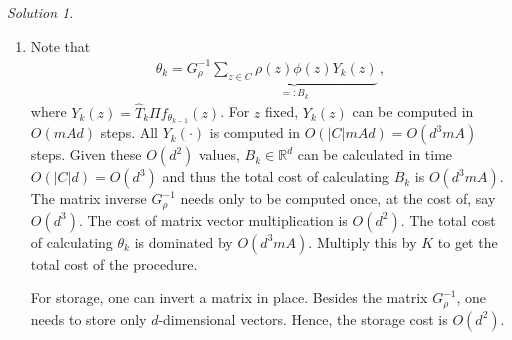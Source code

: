 \documentclass{article}
\newcommand{\R}{\mathbb{R}}
\DeclareMathOperator*{\1}{\mathbbm{1}}
\newcommand{\0}{\mathbf{0}}
\theoremstyle{definition}
\theoremstyle{remark}
\newtheorem*{solution*}{Solution}
\theoremstyle{theorem}
\begin{document}
\begin{solution*}
\mbox{}

\begin{enumerate}
\item 
Note that 
\begin{align}
\theta_k = G_{\rho}^{-1} \underbrace{\sum_{z\in C} \rho(z) \phi(z) Y_k(z)}_{=:B_k}\,,
\label{eq:lstk}
\end{align}
where 
$Y_k(z) = \hat T_k \Pi f_{\theta_{k-1}}(z)$.
For $z$ fixed, $Y_k(z)$ can be computed in $O(m A d)$ steps.
All $Y_k(\cdot)$ is computed in $O(|C|mA d) = O(d^3 m A)$ steps. Given these $O(d^2)$ values, $B_k\in \R^d$ can be calculated in time $O(|C|d) = O(d^3)$ and 
thus the total cost of calculating $B_k$ is $O(d^3 m A)$.
The matrix inverse $G_\rho^{-1}$ needs only to be computed once, at the cost of, say $O(d^3)$.
The cost of matrix vector multiplication is $O(d^2)$.
The total cost of calculating $\theta_k$ is dominated by $O(d^3 m A)$.
Multiply this by $K$ to get the total cost of the procedure.

For storage, one can invert a matrix in place. Besides the matrix $G_\rho^{-1}$, one needs to store only $d$-dimensional vectors.
Hence, the storage cost is $O(d^2)$.


\end{enumerate}
\end{solution*}
\end{document}
